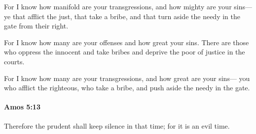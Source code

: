 			\begin{versebox}
					\item[BHS] 
					\item[LXX] 
					\item[ASV] For I know how manifold are your transgressions, and how mighty are your sins— ye that afflict the just, that take a bribe, and that turn aside the needy in the gate from their right.
					\item[NIV] For I know how many are your offenses and how great your sins. There are those who oppress the innocent and take bribes and deprive the poor of justice in the courts.
					\item[NRSV] For I know how many are your transgressions, and how great are your sins— you who afflict the righteous, who take a bribe, and push aside the needy in the gate.
			\end{versebox}

		\paragraph{Amos 5:13} %
			\label{AMOS-5-13}

			Therefore the prudent shall keep silence in that time; for it is an evil time.

